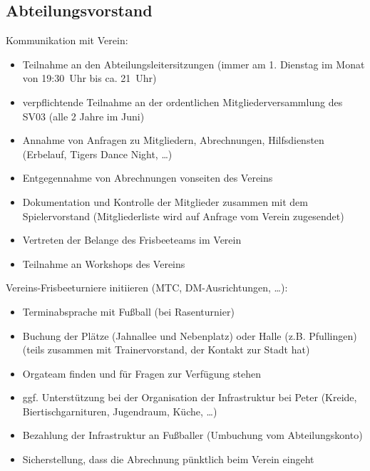 \documentclass[a4 paper, 11pt]{article}
\begin{document}
\subsection{Abteilungsvorstand}
Kommunikation mit Verein:
\begin{itemize}
	\item Teilnahme an den Abteilungsleitersitzungen (immer am 1. Dienstag im Monat von 19:30~Uhr bis ca. 21~Uhr)
	\item verpflichtende Teilnahme an der ordentlichen Mitgliederversammlung des SV03 (alle 2 Jahre im Juni)
	\item Annahme von Anfragen zu Mitgliedern, Abrechnungen, Hilfsdiensten (Erbelauf, Tigers
	Dance Night, \dots)
	\item Entgegennahme von Abrechnungen vonseiten des Vereins
	\item Dokumentation und Kontrolle der Mitglieder zusammen mit dem Spielervorstand (Mitgliederliste wird auf Anfrage vom Verein zugesendet)
	\item Vertreten der Belange des Frisbeeteams im Verein
	\item Teilnahme an Workshops des Vereins
\end{itemize}
\vspace{0.3cm}
Vereins-Frisbeeturniere initiieren (MTC, DM-Ausrichtungen, \dots):
\begin{itemize}
	\item Terminabsprache mit Fußball (bei Rasenturnier)
	\item Buchung der Plätze (Jahnallee und Nebenplatz) oder Halle (z.B. Pfullingen) (teils
	zusammen mit Trainervorstand, der Kontakt zur Stadt hat)
	\item Orgateam finden und für Fragen zur Verfügung stehen
	\item ggf. Unterstützung bei der Organisation der Infrastruktur bei Peter (Kreide, Biertischgarnituren, Jugendraum, Küche, \dots)
	\item Bezahlung der Infrastruktur an Fußballer (Umbuchung vom Abteilungskonto)
	\item Sicherstellung, dass die Abrechnung pünktlich beim Verein eingeht
\end{itemize}
\end{document}
